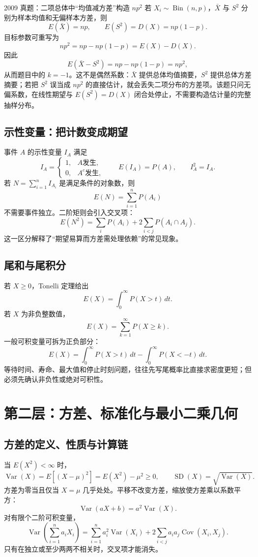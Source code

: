 \documentclass[11pt,a4paper]{ctexart}
\begin{document}
\begin{examplebox}{2009 真题：二项总体中“均值减方差”构造 $np^2$}
若 $X_i\sim\operatorname{Bin}(n,p)$，$\bar X$ 与 $S^2$ 分别为样本均值和无偏样本方差，则
\[
E(\bar X)=np,\qquad E(S^2)=D(X)=np(1-p).
\]
目标参数可重写为
\[
np^2=np-np(1-p)=E(X)-D(X).
\]
因此
\[
E(\bar X-S^2)=np-np(1-p)=np^2,
\]
从而题目中的 $k=-1$。这不是偶然系数：$\bar X$ 提供总体均值摘要，$S^2$ 提供总体方差摘要；若把 $S^2$ 误当成 $np^2$ 的直接估计，就会丢失二项分布的方差项。该题只问无偏系数，在线性期望与 $E(S^2)=D(X)$ 闭合处停止，不需要构造估计量的完整抽样分布。
\end{examplebox}

\subsection{示性变量：把计数变成期望}

事件 $A$ 的示性变量 $I_A$ 满足
\[
I_A=\begin{cases}1,&A\text{发生},\\0,&A^c\text{发生},\end{cases}\qquad E(I_A)=P(A),\qquad I_A^2=I_A.
\]
若 $N=\sum_{i=1}^nI_{A_i}$ 是满足条件的对象数，则
\[
E(N)=\sum_{i=1}^nP(A_i)
\]
不需要事件独立。二阶矩则会引入交叉项：
\[
E(N^2)=\sum_iP(A_i)+2\sum_{i<j}P(A_i\cap A_j).
\]
这一区分解释了“期望易算而方差需处理依赖”的常见现象。

\subsection{尾和与尾积分}

若 $X\geq0$，Tonelli 定理给出
\[
\boxed{E(X)=\int_0^{\infty}P(X>t)\,dt}.
\]
若 $X$ 为非负整数值，
\[
\boxed{E(X)=\sum_{k=1}^{\infty}P(X\geq k)}.
\]
一般可积变量可拆为正负部分：
\[
E(X)=\int_0^\infty P(X>t)\,dt-\int_0^\infty P(X<-t)\,dt.
\]
等待时间、寿命、最大值和停止时刻问题，往往先写尾概率比直接求密度更短；但必须先确认非负性或绝对可积性。

\section{第二层：方差、标准化与最小二乘几何}

\subsection{方差的定义、性质与计算链}

当 $E(X^2)<\infty$ 时，
\[
\operatorname{Var}(X)=E[(X-\mu)^2]=E(X^2)-\mu^2\geq0,\qquad \operatorname{SD}(X)=\sqrt{\operatorname{Var}(X)}.
\]
方差为零当且仅当 $X=\mu$ 几乎处处。平移不改变方差，缩放使方差乘以系数平方：
\[
\operatorname{Var}(aX+b)=a^2\operatorname{Var}(X).
\]
对有限个二阶可积变量，
\[
\operatorname{Var}\left(\sum_{i=1}^na_iX_i\right)
=\sum_{i=1}^na_i^2\operatorname{Var}(X_i)
+2\sum_{i<j}a_ia_j\operatorname{Cov}(X_i,X_j).
\]
只有在独立或至少两两不相关时，交叉项才能消失。
\end{document}
